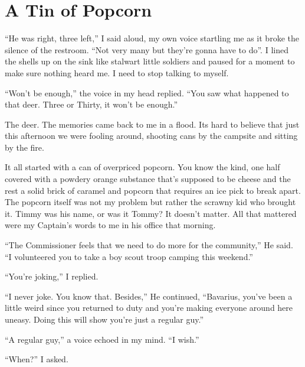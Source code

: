 \chapter{A Tin of Popcorn}





``He was right, three left,'' I said aloud, my own voice startling me
as it broke the silence of the restroom. ``Not very many but they're
gonna have to do''. I lined the shells up on the sink like stalwart
little soldiers and paused for a moment to make sure nothing heard
me. I need to stop talking to myself.



``Won't be enough,'' the voice in my head replied. ``You saw what
happened to that deer. Three or Thirty, it won't be enough.''



The deer. The memories came back to me in a flood. Its hard to
believe that just this afternoon we were fooling around, shooting
cans by the campsite and sitting by the fire.



It all started with a can of overpriced popcorn. You know the kind,
one half covered with a powdery orange substance that's supposed to
be cheese and the rest a solid brick of caramel and popcorn that
requires an ice pick to break apart. The popcorn itself was not my
problem but rather the scrawny kid who brought it. Timmy was his
name, or was it Tommy? It doesn't matter. All that mattered were my
Captain's words to me in his office that morning.



``The Commissioner feels that we need to do more for the community,''
He said. ``I volunteered you to take a boy scout troop camping this
weekend.''



``You're joking,'' I replied.



``I never joke. You know that. Besides,'' He continued, ``Bavarius,
you've been a little weird since you returned to duty and you're
making everyone around here uneasy. Doing this will show you're
just a regular guy.''



``A regular guy,'' a voice echoed in my mind. ``I wish.''



``When?'' I asked.



